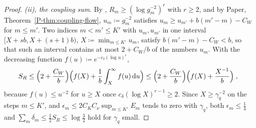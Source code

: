 \documentclass[11pt]{preprint}
\newcommand{\dd}{\mathrm{d}}
\numberwithin{equation}{section}
\theoremstyle{definition}
\theoremstyle{remark}
\theoremstyle{plain}
\begin{document}
\begin{proof}
\emph{(ii), the coupling sum.} By \cite[(2.5), p.~255]{BalabanCRE}, $R_m \geq (\log g_m^{-2})^r$ with $r \geq 2$, and by Paper, Theorem~\ref{P-thm:coupling-flow}, $u_m \coloneqq g_m^{-2}$ satisfies $u_m \geq u_{m'} + b(m' - m) - C_W$ for $m \leq m'$. Two indices $m < m' \leq K'$ with $u_m, u_{m'}$ in one interval $[X + sb, X + (s + 1)b)$, $X \coloneqq \min_{m \leq K'}u_m$, satisfy $b(m' - m) - C_W < b$, so that such an interval contains at most $2 + C_W/b$ of the numbers $u_m$. With the decreasing function $f(u) \coloneqq e^{-c_\delta(\log u)^r}$,
\[
    S_R \leq \Bigl(2 + \frac{C_W}{b}\Bigr)\Bigl(f(X) + \frac1b\int_X^\infty f(u)\,\dd u\Bigr) \leq \Bigl(2 + \frac{C_W}{b}\Bigr)\Bigl(f(X) + \frac{X^{-1}}{b}\Bigr)\;,
\]
because $f(u) \leq u^{-2}$ for $u \geq X$ once $c_\delta(\log X)^{r-1} \geq 2$. Since $X \geq \gamma_q^{-2}$ on the steps $m \leq K'$, and $\epsilon_m \leq 2C_KC_\nu\sup_{m \leq K'}E_m$ tends to zero with $\gamma_q$, both $\epsilon_m \leq \frac14$ and $\sum_m\delta_m \leq \frac12S_R \leq \log\frac32$ hold for $\gamma_q$ small.


\end{proof}
\end{document}
